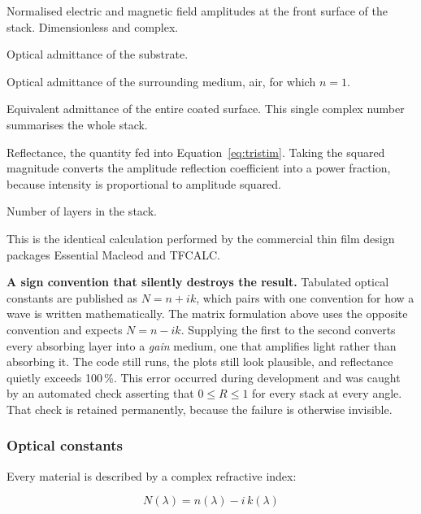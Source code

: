\documentclass[11pt,a4paper]{article}
\newenvironment{symlist}
  {\vspace{-0.2em}\begin{list}{}{%
    \setlength{\leftmargin}{2.4em}\setlength{\labelwidth}{2.0em}%
    \setlength{\labelsep}{0.4em}\setlength{\itemsep}{1pt}%
    \setlength{\parsep}{0pt}\setlength{\topsep}{3pt}%
    \renewcommand{\makelabel}[1]{##1\hfil}}}
  {\end{list}}
\begin{document}
\begin{symlist}
\item[$B, C$] Normalised electric and magnetic field amplitudes at the front
surface of the stack. Dimensionless and complex.
\item[$\eta_\mathrm{sub}$] Optical admittance of the substrate.
\item[$\eta_0$] Optical admittance of the surrounding medium, air, for which
$n = 1$.
\item[$Y$] Equivalent admittance of the entire coated surface. This single
complex number summarises the whole stack.
\item[$R$] Reflectance, the quantity fed into Equation~\eqref{eq:tristim}.
Taking the squared magnitude converts the amplitude reflection coefficient into
a power fraction, because intensity is proportional to amplitude squared.
\item[$J$] Number of layers in the stack.
\end{symlist}

This is the identical calculation performed by the commercial thin film design
packages Essential Macleod and TFCALC.

\begin{keypoint}
\textbf{A sign convention that silently destroys the result.} Tabulated optical
constants are published as $N = n + ik$, which pairs with one convention for
how a wave is written mathematically. The matrix formulation above uses the
opposite convention and expects $N = n - ik$. Supplying the first to the second
converts every absorbing layer into a \emph{gain} medium, one that amplifies
light rather than absorbing it. The code still runs, the plots still look
plausible, and reflectance quietly exceeds 100\,\%. This error occurred during
development and was caught by an automated check asserting that
$0 \le R \le 1$ for every stack at every angle. That check is retained
permanently, because the failure is otherwise invisible.
\end{keypoint}

\subsubsection{Optical constants}

Every material is described by a complex refractive index:

\begin{equation}
N(\lambda) = n(\lambda) - i\,k(\lambda)
\label{eq:nk}
\end{equation}
\end{document}
